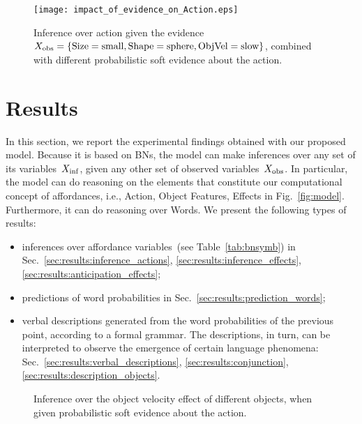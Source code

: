 
\begin{figure}
\centering
\texttt{[image: impact\_of\_evidence\_on\_Action.eps]}
\caption{Inference over action given the evidence $X_\text{obs} =\{\text{Size}=\text{small}, \text{Shape}=\text{sphere}, \text{ObjVel}=\text{slow}\}$, combined with different probabilistic soft evidence about the action.}
\label{fig:impact_of_evidence_on_Action}
\end{figure}

\section{Results}
\label{sec:results}

In this section, we report the experimental findings obtained with our proposed model.
Because it is based on \aclp{BN}, the model can make inferences over any set of its variables~$X_\text{inf}$, given any other set of observed variables~$X_\text{obs}$.
In particular, the model can do reasoning on the elements that constitute our computational concept of affordances, i.e., Action, Object Features, Effects in Fig.~\ref{fig:model}.
Furthermore, it can do reasoning over Words.
We present the following types of results:
\begin{itemize}
  \item inferences over affordance variables~(see Table~\ref{tab:bnsymb}) in Sec.~\ref{sec:results:inference_actions}, \ref{sec:results:inference_effects}, \ref{sec:results:anticipation_effects};

  \item predictions of word probabilities in Sec.~\ref{sec:results:prediction_words};

  \item verbal descriptions generated from the word probabilities of the previous point, according to a formal grammar. The descriptions, in turn, can be interpreted to observe the emergence of certain language phenomena: Sec.~\ref{sec:results:verbal_descriptions}, \ref{sec:results:conjunction}, \ref{sec:results:description_objects}.
\end{itemize}

\begin{figure*}
\centering
{} \quad
%
\caption{Inference over the object velocity effect of different objects, when given probabilistic soft evidence about the action.}
\label{fig:impact_of_evidence_on_ObjVel}
\end{figure*}

